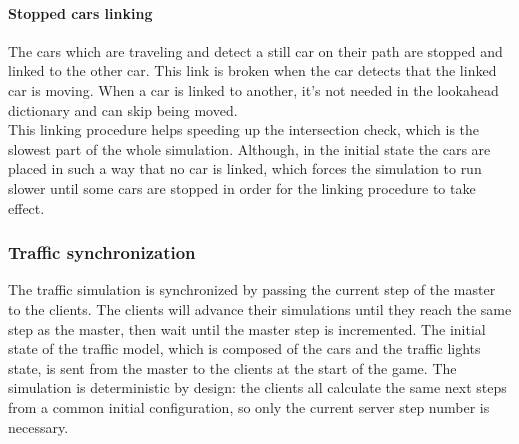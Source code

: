 \documentclass[12pt]{article}
\begin{document}
\paragraph{Stopped cars linking}
The cars which are traveling and detect a still car on their path are stopped and linked to the other car. This link is broken when the car detects that the linked car is moving. When a car is linked to another, it's not needed in the lookahead dictionary and can skip being moved. \\
This linking procedure helps speeding up the intersection check, which is the slowest part of the whole simulation. Although, in the initial state the cars are placed in such a way that no car is linked, which forces the simulation to run slower until some cars are stopped in order for the linking procedure to take effect.

\subsubsection{Traffic synchronization}
The traffic simulation is synchronized by passing the current step of the master to the clients. The clients will advance their simulations until they reach the same step as the master, then wait until the master step is incremented. The initial state of the traffic model, which is composed of the cars and the traffic lights state, is sent from the master to the clients at the start of the game. The simulation is deterministic by design: the clients all calculate the same next steps from a common initial configuration, so only the current server step number is necessary.

\clearpage
\end{document}
